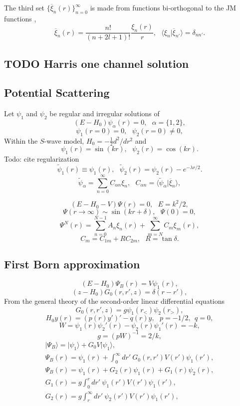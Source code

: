 \documentclass[aip,pra,showpacs,aps,twocolumn,groupedaddress,floatfix]{revtex4}
\newcommand{\beq}{\begin{equation}}
\newcommand{\eeq}{\end{equation}}
\newcommand{\barr}{\begin{array}}
\newcommand{\earr}{\end{array}}
\begin{document}
The third set $\{ \overline{ \xi}_n(r)\}_{n=0}^\infty$ is made from functions
bi-orthogonal to the JM functions \cite{BR76p1491, YF75},
\beq
\overline{\xi}_n(r) = \frac{n!}{(n+2l+1)!} \frac{\xi_n(r)}{r},
\ \ \ \langle \xi_n | \overline{\xi}_{n'} \rangle = \delta_{nn'}.
\eeq

\subsection{TODO Harris one channel solution}

\subsection{Potential Scattering}
Let $\psi_{1}$ and $\psi_{2}$ be regular and irregular solutions of
\beq
(E-H_0)  \psi_{\alpha} (r) =0, \ \ \ \alpha=\{1,2\},
\label{H_0_E_psi}\eeq
\beq
\psi_{1}(r=0) = 0, \ \ \ \psi_{2}(r=0) \neq 0,
\label{psi_1_2}\eeq
Within the $S$-wave model, $H_0 = -\frac{1}{2} d^2/dr^2$ and
\beq
\psi_{1}(r) = \sin(kr) ,\ \ \
\psi_{2}(r) = \cos(kr).
\eeq
Todo: cite regularization
\beq
\widetilde{\psi}_{1}(r) \equiv \psi_{1}(r),
\ \ \ \widetilde{\psi}_{2}(r) = \psi_{2}(r) - e^{-\lambda r /2}.
\eeq
\beq
\widetilde{\psi}_{\alpha} = \sum_{n=0}^\infty C_{\alpha n} \xi_n,
\ \ \ C_{\alpha n} = \langle \widetilde{\psi}_{\alpha} | \overline{\xi}_n \rangle,
\eeq

\beq
(E-H_0-V) \Psi (r) =0, \ \ \ E=k^2/2,
\eeq
\beq
\Psi(r \rightarrow \infty) \sim \sin(kr+\delta), \ \ \ \Psi(0)=0,
\eeq
\beq
\Psi^N(r) = \sum_{n=0}^{N-1} A_n \xi_n(r) + \sum_{m=N}^{\infty} C_m \xi_m(r),
\eeq
\beq
C_m = C_{1m} + R C_{2m}, \ \ \ R=\tan \delta.
\eeq

\subsection{First Born approximation}
\beq
(E-H_0) \Psi_B (r) = V \psi_{1}(r),
\eeq
\beq
(z-H_0) G_0(r,r', z) = \delta(r-r'),
\eeq
From the general theory of the second-order linear differential equations
\beq
G_0(r,r', z) = g \psi_{1}(r_<) \psi_{2}(r_>),
\eeq
\beq
H_0 y(r) = (p(r) y')' - q(r) y,\ \ \ p = -1/2, \ \ q = 0,
\eeq
\beq
W = \psi_{1}(r) \psi_{2}'(r) - \psi_{2}(r) \psi_{1}'(r) = -k,
\eeq
\beq
g = (pW)^{-1}= 2/k,
\eeq
\beq \barr{l}
| \Psi_B \rangle = | \psi_1 \rangle + G_0 V |\psi_1 \rangle,\\
\Psi_B(r) = \psi_1(r) +  \int_0^\infty dr'\ G_0(r,r') V(r') \psi_1(r'),
\earr \eeq
\beq \barr{l}
\Psi_B(r) = \psi_1(r) +  G_2(r) \psi_1(r) + G_1(r) \psi_2(r),\\
G_1(r) = g \int_0^r dr'\ \psi_1(r') V(r') \psi_1(r'), \\
G_2(r) = g \int_r^\infty dr'\ \psi_2(r') V(r') \psi_1(r'),
\earr \eeq
\end{document}
